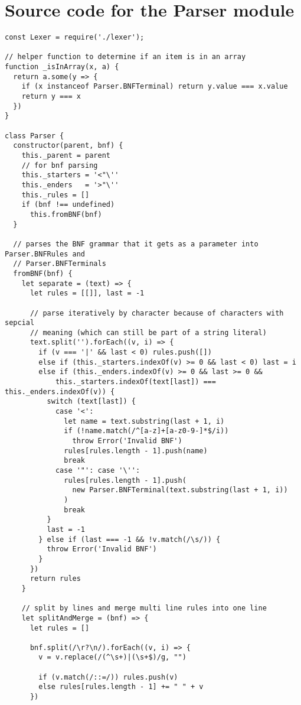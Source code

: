 \section{Source code for the Parser module}
\begin{lstlisting}[frame=single]
const Lexer = require('./lexer');

// helper function to determine if an item is in an array
function _isInArray(x, a) {
  return a.some(y => {
    if (x instanceof Parser.BNFTerminal) return y.value === x.value
    return y === x 
  })
}

class Parser {
  constructor(parent, bnf) {
    this._parent = parent
    // for bnf parsing
    this._starters = '<"\''
    this._enders   = '>"\''
    this._rules = []
    if (bnf !== undefined)
      this.fromBNF(bnf)
  }
  
  // parses the BNF grammar that it gets as a parameter into Parser.BNFRules and
  // Parser.BNFTerminals
  fromBNF(bnf) {
    let separate = (text) => {
      let rules = [[]], last = -1
      
      // parse iteratively by character because of characters with sepcial 
      // meaning (which can still be part of a string literal)
      text.split('').forEach((v, i) => {
        if (v === '|' && last < 0) rules.push([])
        else if (this._starters.indexOf(v) >= 0 && last < 0) last = i
        else if (this._enders.indexOf(v) >= 0 && last >= 0 && 
            this._starters.indexOf(text[last]) === this._enders.indexOf(v)) {
          switch (text[last]) {
            case '<':
              let name = text.substring(last + 1, i)
              if (!name.match(/^[a-z]+[a-z0-9-]*$/i))
                throw Error('Invalid BNF')
              rules[rules.length - 1].push(name)
              break
            case '"': case '\'':
              rules[rules.length - 1].push(
                new Parser.BNFTerminal(text.substring(last + 1, i))
              )  
              break
          }
          last = -1
        } else if (last === -1 && !v.match(/\s/)) {
          throw Error('Invalid BNF')
        }
      })
      return rules
    }
    
    // split by lines and merge multi line rules into one line
    let splitAndMerge = (bnf) => {
      let rules = []
      
      bnf.split(/\r?\n/).forEach((v, i) => {
        v = v.replace(/(^\s+)|(\s+$)/g, "")
        
        if (v.match(/::=/)) rules.push(v)
        else rules[rules.length - 1] += " " + v
      })
      

\end{lstlisting}
